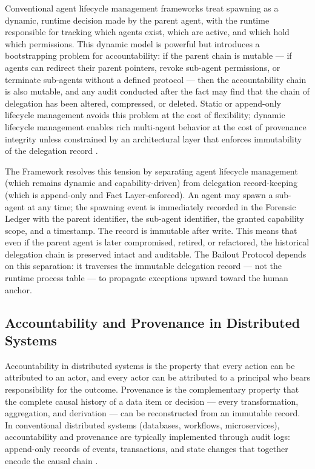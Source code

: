 Conventional agent lifecycle management frameworks treat spawning as a dynamic, runtime decision made by the parent agent, with the runtime responsible for tracking which agents exist, which are active, and which hold which permissions. This dynamic model is powerful but introduces a bootstrapping problem for accountability: if the parent chain is mutable — if agents can redirect their parent pointers, revoke sub-agent permissions, or terminate sub-agents without a defined protocol — then the accountability chain is also mutable, and any audit conducted after the fact may find that the chain of delegation has been altered, compressed, or deleted. Static or append-only lifecycle management avoids this problem at the cost of flexibility; dynamic lifecycle management enables rich multi-agent behavior at the cost of provenance integrity unless constrained by an architectural layer that enforces immutability of the delegation record \cite{compel-audit, agility-accountability}.

The \bxthree{} Framework resolves this tension by separating agent lifecycle management (which remains dynamic and capability-driven) from delegation record-keeping (which is append-only and Fact Layer-enforced). An agent may spawn a sub-agent at any time; the spawning event is immediately recorded in the Forensic Ledger with the parent identifier, the sub-agent identifier, the granted capability scope, and a timestamp. The record is immutable after write. This means that even if the parent agent is later compromised, retired, or refactored, the historical delegation chain is preserved intact and auditable. The Bailout Protocol depends on this separation: it traverses the immutable delegation record — not the runtime process table — to propagate exceptions upward toward the human anchor.

\subsection{Accountability and Provenance in Distributed Systems}
\label{sec:provenance}

Accountability in distributed systems is the property that every action can be attributed to an actor, and every actor can be attributed to a principal who bears responsibility for the outcome. Provenance is the complementary property that the complete causal history of a data item or decision — every transformation, aggregation, and derivation — can be reconstructed from an immutable record. In conventional distributed systems (databases, workflows, microservices), accountability and provenance are typically implemented through audit logs: append-only records of events, transactions, and state changes that together encode the causal chain \cite{compel-audit, augment-audit}.

